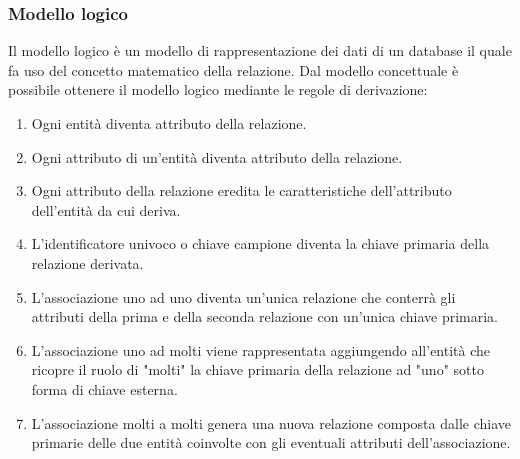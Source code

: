 \documentclass{article}
\begin{document}
	\subsubsection{\textbf{Modello logico}}
	Il modello logico è un modello di rappresentazione dei dati di un database il quale fa uso del concetto matematico della relazione. Dal modello concettuale è possibile ottenere il modello logico mediante le regole di derivazione:\\
	\begin{enumerate}
		\item Ogni entità diventa attributo della relazione.
		\item Ogni attributo di un'entità diventa attributo della relazione.\\
		\item Ogni attributo della relazione eredita le caratteristiche dell'attributo dell'entità da cui deriva.
		\item L'identificatore univoco o chiave campione diventa la chiave primaria della relazione derivata.
		\item L'associazione uno ad uno diventa un'unica relazione che conterrà gli attributi della prima e della seconda relazione con un'unica chiave primaria.
		\item L'associazione uno ad molti viene rappresentata aggiungendo all'entità che ricopre il ruolo di "molti" la chiave primaria della relazione ad "uno" sotto forma di chiave esterna.
		\item L'associazione molti a molti genera una nuova relazione composta dalle chiave primarie delle due entità coinvolte con gli eventuali attributi dell'associazione.
	\end{enumerate}
	
\end{document}
